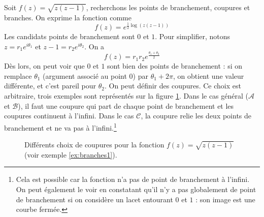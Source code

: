 \begin{myexem}\label{ex:branches1}
    Soit $f(z) = \sqrt{z(z-1)}$, recherchons
    les points de branchement, coupures et branches.
    On exprime la fonction comme 
    \[f(z) = e^{\frac{1}{2}\log(z(z-1))}\]
    Les candidats points de branchement sont $0$ et $1$.
    Pour simplifier, notons $z = r_1 e^{i\theta_1}$ et
    $z-1 = r_2 e^{i\theta_2}$.
    On a \[f(z) = r_1 r_2 e^{\frac{\theta_1+\theta_2}{2}}\]
    Dès lors, on peut voir que $0$ et $1$ sont bien des points
    de branchement : si on remplace $\theta_1$ (argument associé
    au point $0$) par $\theta_1 + 2\pi$, on obtient une valeur
    différente, et c'est pareil pour $\theta_2$.
    On peut définir des coupures. Ce choix est arbitraire, trois
    exemples sont représentés sur la figure \ref{fig:branches1}.
    Dans le cas général ($\mathcal{A}$ et $\mathcal{B}$), 
    il faut une coupure qui part de chaque point
    de branchement et les coupures continuent à l'infini.
    Dans le cas $\mathcal{C}$, la coupure relie les deux points de
    branchement et ne va pas à l'infini.\footnote{
        Cela est possible car la fonction n'a pas de point de
        branchement à l'infini. On peut également le voir en constatant
        qu'il n'y a pas \og globalement \fg de point de branchement
        si on considère un lacet entourant $0$ et $1$ : son image est
        une courbe fermée.}
    
    \begin{figure}
    \centering
    \caption{Différents choix de coupures pour la fonction $f(z) = \sqrt{z(z-1)}$
        (voir exemple \ref{ex:branches1}).}
    \label{fig:branches1}
    \end{figure}
\end{myexem}

